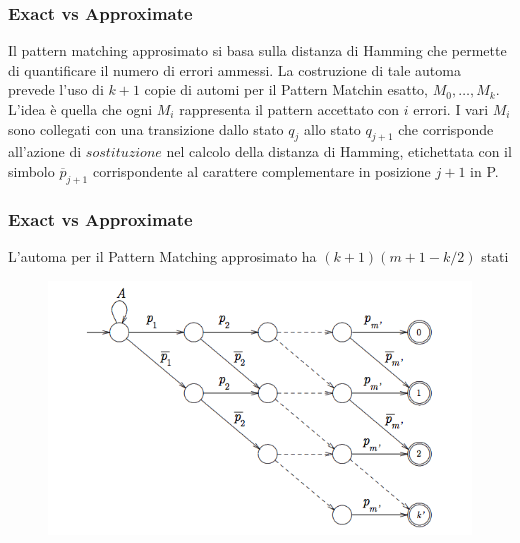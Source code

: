 \documentclass{beamer}
\begin{document}
\begin{frame}
\frametitle{Exact vs Approximate}

Il pattern matching approsimato si basa sulla distanza di Hamming che permette di quantificare il numero di errori ammessi.
La costruzione di tale automa prevede l'uso di $k+1$ copie di automi per il Pattern Matchin esatto, $M_0,\dots ,M_k$. \\
L'idea è quella che ogni $M_i$ rappresenta il pattern accettato con $i$ errori.
I vari $M_i$ sono collegati con una transizione dallo stato $q_j$ allo stato $q_{j+1}$ che corrisponde all'azione di $sostituzione$ nel calcolo della distanza di Hamming, etichettata con il simbolo $\overline{p}_{j+1}$ corrispondente al carattere complementare in posizione $j+1$ in P.\\

\end{frame}

\begin{frame}
\frametitle{Exact vs Approximate}
\begin{theorem}[]
L'automa per il Pattern Matching approsimato ha $(k+1)(m+1 - k/2)$ stati
\end{theorem}

\begin{figure}[p]
    \includegraphics[scale=0.4]{approssimato.png}
\end{figure}

%

\end{frame}
\end{document}
